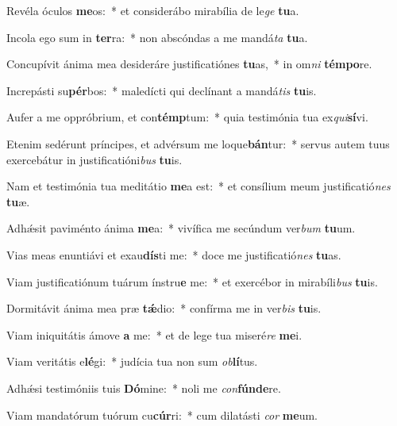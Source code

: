 \item Revéla óculos \textbf{me}os:~* et considerábo mirabília de le\textit{ge} \textbf{tu}a.
\item Incola ego sum in \textbf{ter}ra:~* non abscóndas a me mandá\textit{ta} \textbf{tu}a.
\item Concupívit ánima mea desideráre justificatiónes \textbf{tu}as,~* in om\textit{ni} \textbf{tém}\textbf{po}re.
\item Increpásti su\textbf{pér}bos:~* maledícti qui declínant a mandá\textit{tis} \textbf{tu}is.
\item Aufer a me oppróbrium, et con\textbf{témp}tum:~* quia testimónia tua ex\textit{qui}\textbf{sí}vi.
\item Etenim sedérunt príncipes, et advérsum me loque\textbf{bán}tur:~* servus autem tuus exercebátur in justificatióni\textit{bus} \textbf{tu}is.
\item Nam et testimónia tua meditátio \textbf{me}a est:~* et consílium meum justificatió\textit{nes} \textbf{tu}æ.
\item Adhǽsit paviménto ánima \textbf{me}a:~* vivífica me secúndum ver\textit{bum} \textbf{tu}um.
\item Vias meas enuntiávi et exau\textbf{dís}ti me:~* doce me justificatió\textit{nes} \textbf{tu}as.
\item Viam justificatiónum tuárum ínstru\textbf{e} me:~* et exercébor in mirabíli\textit{bus} \textbf{tu}is.
\item Dormitávit ánima mea præ \textbf{tǽ}dio:~* confírma me in ver\textit{bis} \textbf{tu}is.
\item Viam iniquitátis ámove \textbf{a} me:~* et de lege tua miseré\textit{re} \textbf{me}i.
\item Viam veritátis e\textbf{lé}gi:~* judícia tua non sum \textit{ob}\textbf{lí}tus.
\item Adhǽsi testimóniis tuis \textbf{Dó}mine:~* noli me \textit{con}\textbf{fún}\textbf{de}re.
\item Viam mandatórum tuórum cu\textbf{cúr}ri:~* cum dilatásti \textit{cor} \textbf{me}um.
